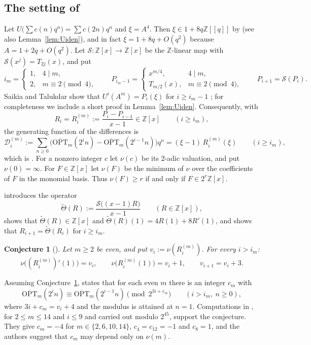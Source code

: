 \documentclass[11pt]{amsart}
\newtheorem{conjecture}[theorem]{Conjecture}
\theoremstyle{definition}
\theoremstyle{remark}
\newcommand{\Z}{\mathbb{Z}}
\newcommand{\OPT}{\overline{\mathrm{OPT}}}
\newcommand{\Sop}{\mathcal{S}}
\newcommand{\Th}{\widetilde{\Theta}}
\newcommand{\Dc}{\mathcal{D}}
\begin{document}
\subsection*{The setting of \texorpdfstring{\cite[\S6]{ST}}{[ST, Sec. 6]}}
Let $U\big(\sum c(n)q^n\big)=\sum c(2n)q^n$ and $\xi=A^4$. Then $\xi\in 1+8q\Z[[q]]$ by \cite[(2.16)]{ST} (see also Lemma~\ref{lem:Uiden}), and in fact $\xi=1+8q+O(q^2)$ because $A=1+2q+O(q^2)$. Let $\Sop\colon\Z[x]\to\Z[x]$ be the $\Z$-linear map with $\Sop(x^j)=T_{2j}(x)$, and put
\[
  i_m=\begin{cases}1,&4\mid m,\\ 2,&m\equiv2\pmod 4,\end{cases}\qquad
  P_{i_m-1}=\begin{cases}x^{m/4},&4\mid m,\\ T_{m/2}(x),&m\equiv2\pmod 4,\end{cases}\qquad
  P_{i+1}=\Sop(P_i).
\]
Saikia and Talukdar show that $U^i(A^m)=P_i(\xi)$ for $i\ge i_m-1$ \cite[\S6, (6.3)--(6.4) and the display following (6.4)]{ST}; for completeness we include a short proof in Lemma~\ref{lem:Uiden}. Consequently, with
\[
  R_i=R^{(m)}_i:=\frac{P_i-P_{i-1}}{x-1}\in\Z[x]\qquad(i\ge i_m),
\]
the generating function of the differences is
\begin{equation}\label{eq:65}
  \Dc^{(m)}_i:=\sum_{n\ge0}\big(\OPT_m(2^in)-\OPT_m(2^{i-1}n)\big)q^n=(\xi-1)\,R^{(m)}_i(\xi)\qquad(i\ge i_m),
\end{equation}
which is \cite[(6.5)]{ST}. For a nonzero integer $c$ let $\nu(c)$ be its $2$-adic valuation, and put $\nu(0)=\infty$. For $F\in\Z[x]$ let $\nu(F)$ be the minimum of $\nu$ over the coefficients of $F$ in the monomial basis. Thus $\nu(F)\ge r$ if and only if $F\in 2^r\Z[x]$.

\cite[Lemma~6.1]{ST} introduces the operator
\[
  \Th(R):=\frac{\Sop\big((x-1)R\big)}{x-1}\qquad(R\in\Z[x]),
\]
shows that $\Th(R)\in\Z[x]$ and $\Th(R)(1)=4R(1)+8R'(1)$, and shows that $R_{i+1}=\Th(R_i)$ for $i\ge i_m$.

\begin{conjecture}[{\cite[Conjecture~6.2]{ST}}]\label{conj}
Let $m\ge2$ be even, and put $v_i:=\nu(R^{(m)}_i)$. For every $i>i_m$:
\[
  \nu\big((R^{(m)}_i)'(1)\big)=v_i,\qquad \nu\big(R^{(m)}_i(1)\big)=v_i+1,\qquad v_{i+1}=v_i+3 .
\]
\end{conjecture}

Assuming Conjecture~\ref{conj}, \cite[Corollary~6.3]{ST} states that for each even $m$ there is an integer $c_m$ with
\begin{equation}\label{eq:cong}
  \OPT_m(2^in)\equiv\OPT_m(2^{i-1}n)\pmod{2^{3i+c_m}}\qquad(i>i_m,\ n\ge0),
\end{equation}
where $3i+c_m=v_i+4$ and the modulus is attained at $n=1$. Computations in \cite{ST}, for $2\le m\le14$ and $i\le 9$ and carried out modulo $2^{45}$, support the conjecture. They give $c_m=-4$ for $m\in\{2,6,10,14\}$, $c_4=c_{12}=-1$ and $c_8=1$, and the authors suggest that $c_m$ may depend only on $\nu(m)$.
\end{document}
